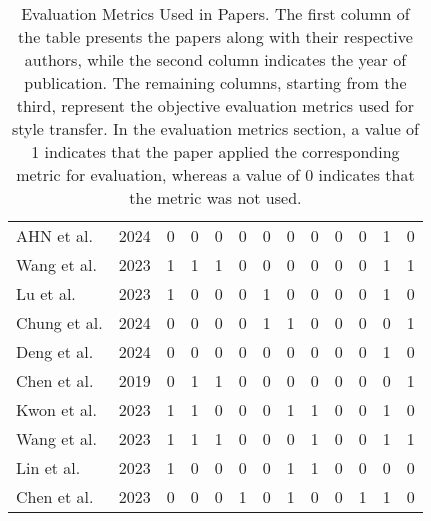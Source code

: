 \begin{table}[t]
{\begin{tabular}{lcccccccccccc}
                AHN et al.\citep{63ahn2024dreamstyler} & 2024 & 0 & 0 & 0 & 0 & 0 & 0 & 0 & 0 & 0 & 1 & 0 \\
                Wang et al.\citep{64wang2023stylediffusion} & 2023 & 1 & 1 & 1 & 0 & 0 & 0 & 0 & 0 & 0 & 1 & 1 \\
                Lu et al.\citep{65lu2023specialist} & 2023 & 1 & 0 & 0 & 0 & 1 & 0 & 0 & 0 & 0 & 1 & 0 \\
                Chung et al.\citep{66chung2024style} & 2024 & 0 & 0 & 0 & 0 & 1 & 1 & 0 & 0 & 0 & 0 & 1 \\
                Deng et al.\citep{67deng2024z} & 2024 & 0 & 0 & 0 & 0 & 0 & 0 & 0 & 0 & 0 & 1 & 0 \\
                Chen et al.\citep{70chen2019drop} & 2019 & 0 & 1 & 1 & 0 & 0 & 0 & 0 & 0 & 0 & 0 & 1 \\
                Kwon et al.\citep{71kwon2024aesfa} & 2023 & 1 & 1 & 0 & 0 & 0 & 1 & 1 & 0 & 0 & 1 & 0 \\
                Wang et al.\citep{72wang2023microast} & 2023 & 1 & 1 & 1 & 0 & 0 & 0 & 1 & 0 & 0 & 1 & 1 \\
                Lin et al.\citep{78lin2023adacm} & 2023 & 1 & 0 & 0 & 0 & 0 & 1 & 1 & 0 & 0 & 0 & 0 \\
                Chen et al.\citep{80cheng2023user} & 2023 & 0 & 0 & 0 & 1 & 0 & 1 & 0 & 0 & 1 & 1 & 0 \\
                \bottomrule
            \end{tabular}
    }
    \caption{Evaluation Metrics Used in Papers. The first column of the table presents the papers along with their respective authors, while the second column indicates the year of publication. The remaining columns, starting from the third, represent the objective evaluation metrics used for style transfer. In the evaluation metrics section, a value of 1 indicates that the paper applied the corresponding metric for evaluation, whereas a value of 0 indicates that the metric was not used.}\label{table1_Evaluation}
\end{table}


